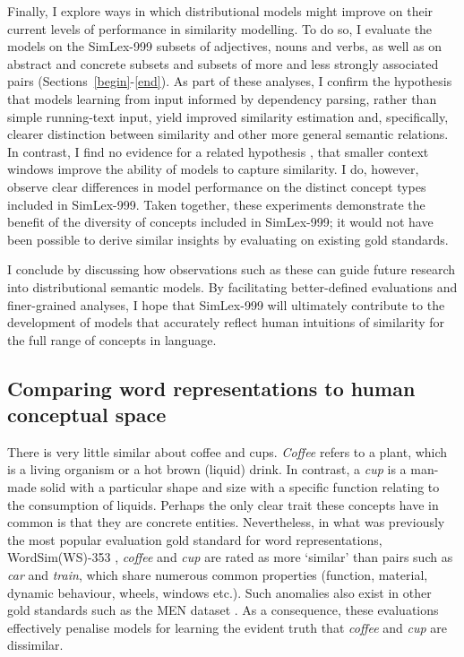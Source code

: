 Finally, I explore ways in which distributional models might improve on their current levels of performance in similarity modelling. To do so, I evaluate the models on the SimLex-999 subsets of adjectives, nouns and verbs, as well as on abstract and concrete subsets and subsets of more and less strongly associated pairs (Sections~\ref{begin}-\ref{end}). As part of these analyses, I confirm the hypothesis \cite{agirre2009study,levy2014dependency} that models learning from input informed by dependency parsing, rather than simple running-text input, yield improved similarity estimation and, specifically, clearer distinction between similarity and other more general semantic relations. In contrast, I find no evidence for a related hypothesis \cite{agirre2009study,kiela2014systematic}, that smaller context windows improve the ability of models to capture similarity. I do, however, observe clear differences in model performance on the distinct concept types included in SimLex-999. Taken together, these experiments demonstrate the benefit of the diversity of concepts included in SimLex-999; it would not have been possible to derive similar insights by evaluating on existing gold standards.

I conclude by discussing how observations such as these can guide future research into distributional semantic models. By facilitating better-defined evaluations and finer-grained analyses, I hope that SimLex-999 will ultimately contribute to the development of models that accurately reflect human intuitions of similarity for the full range of concepts in language. 

\subsection{Comparing word representations to human conceptual space}

There is very little similar about coffee and cups. \emph{Coffee} refers to a plant, which is a living organism or a hot brown (liquid) drink. In contrast, a \emph{cup} is a man-made solid with a particular shape and size with a specific function relating to the consumption of liquids. Perhaps the only clear trait these concepts have in common is that they are concrete entities. Nevertheless, in what was previously the most popular evaluation gold standard for word representations, WordSim(WS)-353 \cite{finkelstein2001placing}, \emph{coffee} and \emph{cup} are rated  as more `similar' than pairs such as \emph{car} and \emph{train}, which share numerous common properties (function, material, dynamic behaviour, wheels, windows etc.). Such anomalies also exist in other gold standards such as the MEN dataset \cite{bruni2012distributional}. As a consequence, these evaluations effectively penalise models for learning the evident truth that \emph{coffee} and \emph{cup} are dissimilar. 

